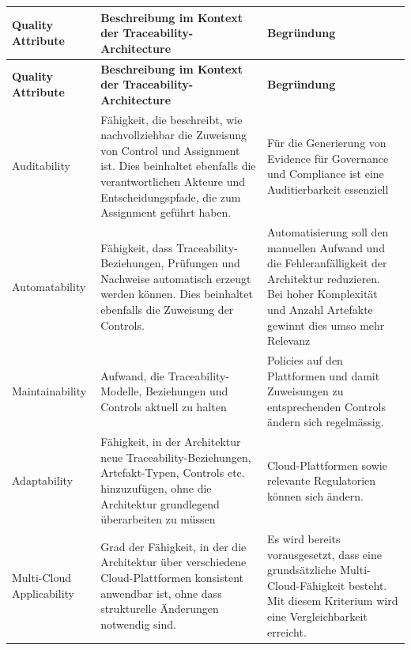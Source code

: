 \begin{longtable}{|
  L{3cm}|
  p{\dimexpr(\textwidth-3cm-6\arrayrulewidth)/2}|
  p{\dimexpr(\textwidth-3cm-6\arrayrulewidth)/2}|
}
    \hline

    \textbf{Quality Attribute} & \textbf{Beschreibung im Kontext der Traceability-Architecture} & \textbf{Begründung} \\
    \hline
    \endfirsthead

    \hline
    \textbf{Quality Attribute} & \textbf{Beschreibung im Kontext der Traceability-Architecture} & \textbf{Begründung} \\
    \hline
    \endhead

    Auditability &
    Fähigkeit, die beschreibt, wie nachvollziehbar die Zuweisung von Control und Assignment ist. Dies beinhaltet ebenfalls die verantwortlichen Akteure und Entscheidungspfade, die zum Assignment geführt haben. &
    Für die Generierung von Evidence für Governance und Compliance ist eine Auditierbarkeit essenziell
    \\
    \hline

    Automatability &
    Fähigkeit, dass Traceability-Beziehungen, Prüfungen und Nachweise automatisch erzeugt werden können. Dies beinhaltet ebenfalls die Zuweisung der Controls. &
    Automatisierung soll den manuellen Aufwand und die Fehleranfälligkeit der Architektur reduzieren. Bei hoher Komplexität und Anzahl Artefakte gewinnt dies umso mehr Relevanz
    \\
    \hline

    Maintainability &
    Aufwand, die Traceability-Modelle, Beziehungen und Controls aktuell zu halten &
    Policies auf den Plattformen und damit Zuweisungen zu entsprechenden Controls ändern sich regelmässig.
    \\
    \hline

    Adaptability &
    Fähigkeit, in der Architektur neue Traceability-Beziehungen, Artefakt-Typen, Controls etc. hinzuzufügen, ohne die Architektur grundlegend überarbeiten zu müssen &
    Cloud-Plattformen sowie relevante Regulatorien können sich ändern.
    \\
    \hline

    Multi-Cloud Applicability &
    Grad der Fähigkeit, in der die Architektur über verschiedene Cloud-Plattformen konsistent anwendbar ist, ohne dass strukturelle Änderungen notwendig sind. &
    Es wird bereits vorausgesetzt, dass eine grundsätzliche Multi-Cloud-Fähigkeit besteht. Mit diesem Kriterium wird eine Vergleichbarkeit erreicht.
    \\
    \hline


\end{longtable}
